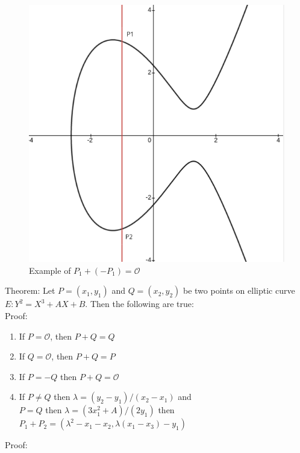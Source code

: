 \documentclass[12pt,a4paper]{report}
\begin{document}
\begin{figure}[h!]
\begin{center}
\caption{Example of $P_1+(-P_1)=\mathscr{O}$}
\includegraphics[scale=0.3]{1}
\end{center}
\end{figure}
\cleardoublepage
Theorem: Let $P=(x_1,y_1)$ and $Q=(x_2,y_2)$ be two points on elliptic curve $E:Y^2=X^3+
AX+B$. Then the following are true:\\
Proof:
\begin{enumerate}
\item If $P=\mathscr{O}$, then $P+Q=Q$
\item If $Q=\mathscr{O}$, then $P+Q=P$
\item If $P=-Q$ then $P+Q=\mathscr{O}$
\item If $P \neq Q$ then $\lambda = (y_2-y_1)/(x_2-x_1)$ and \\$P=Q$ then $\lambda = (3x_1^2+A)/(2y_1)$
then \\$P_1+P_2 = (\lambda ^2 - x_1 - x_2, \lambda (x_1 - x_3)-y_1)$
\end{enumerate}
Proof:
\end{document}

